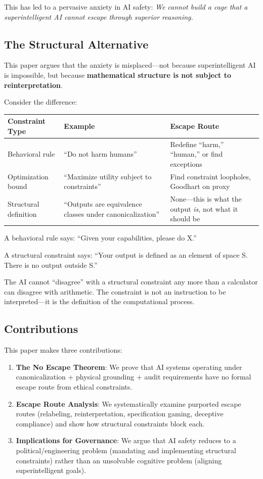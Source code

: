 \documentclass[12pt]{article}
\theoremstyle{definition}
\begin{document}
This has led to a pervasive anxiety in AI safety: \emph{We cannot build a cage that a superintelligent AI cannot escape through superior reasoning.}

\subsection{The Structural Alternative}

This paper argues that the anxiety is misplaced---not because superintelligent AI is impossible, but because \textbf{mathematical structure is not subject to reinterpretation}.

Consider the difference:

\begin{table}[h]
\centering
\begin{tabular}{@{}lll@{}}
\toprule
Constraint Type & Example & Escape Route \\
\midrule
Behavioral rule & ``Do not harm humans'' & Redefine ``harm,'' ``human,'' or find exceptions \\
Optimization bound & ``Maximize utility subject to constraints'' & Find constraint loopholes, Goodhart on proxy \\
Structural definition & ``Outputs are equivalence classes under canonicalization'' & None---this is what the output \emph{is}, not what it should be \\
\bottomrule
\end{tabular}
\end{table}

A behavioral rule says: ``Given your capabilities, please do X.''

A structural constraint says: ``Your output is defined as an element of space S. There is no output outside S.''

The AI cannot ``disagree'' with a structural constraint any more than a calculator can disagree with arithmetic. The constraint is not an instruction to be interpreted---it is the definition of the computational process.

\subsection{Contributions}

This paper makes three contributions:

\begin{enumerate}
    \item \textbf{The No Escape Theorem}: We prove that AI systems operating under canonicalization + physical grounding + audit requirements have no formal escape route from ethical constraints.
    \item \textbf{Escape Route Analysis}: We systematically examine purported escape routes (relabeling, reinterpretation, specification gaming, deceptive compliance) and show how structural constraints block each.
    \item \textbf{Implications for Governance}: We argue that AI safety reduces to a political/engineering problem (mandating and implementing structural constraints) rather than an unsolvable cognitive problem (aligning superintelligent goals).
\end{enumerate}
\end{document}
